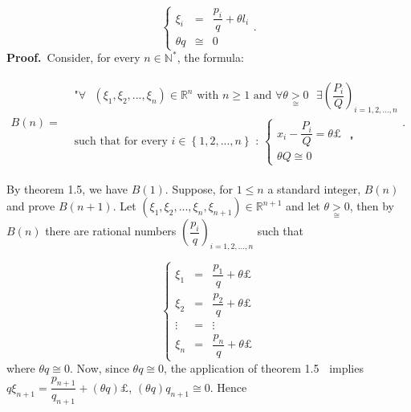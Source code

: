 \documentclass[12pt]{article}
\begin{document}
\begin{equation}
\left\{ 
\begin{array}{ccc}
\xi _{i} & = & \dfrac{p_{i}}{q}+\theta l_{i} \\ 
\theta q & \cong & 0%
\end{array}%
\right. \text{.}  \tag{2.2}
\end{equation}%
\textbf{Proof.}\ Consider, for every $n\in \mathbb{N}^{\ast }$, the formula:

\begin{center}
$%
\begin{array}{cc}
B\left( n\right) = & 
\begin{array}{c}
\text{"}\forall \text{ }\left( \xi _{1},\xi _{2},...,\xi _{n}\right) \in 
\mathbb{R}^{n}\text{ with }n\geq 1\text{ and }\forall \theta \underset{\cong 
}{>}0\text{ }\exists \left( \dfrac{P_{i}}{Q}\right) _{i=1,2,...,n} \\ 
\text{such that for every }i\in \left\{ 1,2,...,n\right\} \text{ : }\left\{ 
\begin{array}{c}
x_{i}-\dfrac{P_{i}}{Q}=\theta \pounds  \\ 
\theta Q\cong 0%
\end{array}%
\right. \text{ \ "}%
\end{array}%
\text{.}%
\end{array}%
$
\end{center}

By theorem 1.5, we have $B\left( 1\right) $. Suppose, for $1\leq n$ a
standard integer, $B\left( n\right) $ and prove $B\left( n+1\right) $. Let $%
\left( \xi _{1},\xi _{2},...,\xi _{n},\xi _{n+1}\right) \in \mathbb{R}^{n+1}$
and let $\theta \underset{\cong }{>}0$, then by $B\left( n\right) $ there
are rational numbers $\left( \dfrac{p_{i}}{q}\right) _{i=1,2,...,n}$ such
that

\begin{equation}
\left\{ 
\begin{array}{ccc}
\xi _{1} & = & \dfrac{p_{1}}{q}+\theta \pounds  \\ 
\xi _{2} & = & \dfrac{p_{2}}{q}+\theta \pounds  \\ 
\vdots & = & \vdots \\ 
\xi _{n} & = & \dfrac{p_{n}}{q}+\theta \pounds 
\end{array}%
\right.  \tag{2.3}
\end{equation}%
where $\theta q\cong 0$. Now, since $\theta q\cong 0$, the application of
theorem 1.5\textbf{\ } implies $q\xi _{n+1}=\dfrac{p_{n+1}}{q_{n+1}}+\left(
\theta q\right) \pounds $, $\left( \theta q\right) q_{n+1}\cong 0$. Hence
\end{document}
